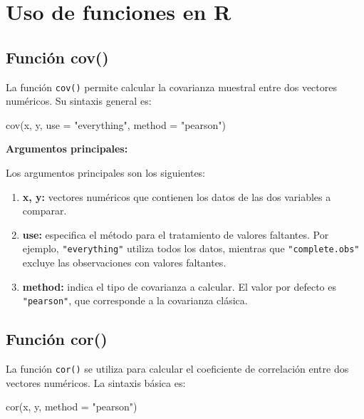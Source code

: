 \documentclass[
  spanish,
  letterpaper,
]{book}
\newenvironment{Shaded}{\begin{snugshade}}{\end{snugshade}}
\newcommand{\AttributeTok}[1]{\textcolor[rgb]{0.40,0.45,0.13}{#1}}
\newcommand{\FunctionTok}[1]{\textcolor[rgb]{0.28,0.35,0.67}{#1}}
\newcommand{\NormalTok}[1]{\textcolor[rgb]{0.00,0.23,0.31}{#1}}
\newcommand{\StringTok}[1]{\textcolor[rgb]{0.13,0.47,0.30}{#1}}
\begin{document}
\section{Uso de funciones en R}\label{uso-de-funciones-en-r}

\subsection{Función cov()}\label{funciuxf3n-cov}

La función \texttt{cov()} permite calcular la covarianza muestral entre
dos vectores numéricos. Su sintaxis general es:

\begin{Shaded}
\begin{Highlighting}[]
\FunctionTok{cov}\NormalTok{(x, y, }\AttributeTok{use =} \StringTok{"everything"}\NormalTok{, }\AttributeTok{method =} \StringTok{"pearson"}\NormalTok{)}
\end{Highlighting}
\end{Shaded}

\textbf{Argumentos principales:}

Los argumentos principales son los siguientes:

\begin{enumerate}
\def\labelenumi{\arabic{enumi}.}
\item
  \textbf{x, y:} vectores numéricos que contienen los datos de las dos
  variables a comparar.
\item
  \textbf{use:} especifica el método para el tratamiento de valores
  faltantes. Por ejemplo, \texttt{"everything"} utiliza todos los datos,
  mientras que \texttt{"complete.obs"} excluye las observaciones con
  valores faltantes.
\item
  \textbf{method:} indica el tipo de covarianza a calcular. El valor por
  defecto es \texttt{"pearson"}, que corresponde a la covarianza
  clásica.
\end{enumerate}

\subsection{Función cor()}\label{funciuxf3n-cor}

La función \texttt{cor()} se utiliza para calcular el coeficiente de
correlación entre dos vectores numéricos. La sintaxis básica es:

\begin{Shaded}
\begin{Highlighting}[]
\FunctionTok{cor}\NormalTok{(x, y, }\AttributeTok{method =} \StringTok{"pearson"}\NormalTok{)}
\end{Highlighting}
\end{Shaded}
\end{document}
